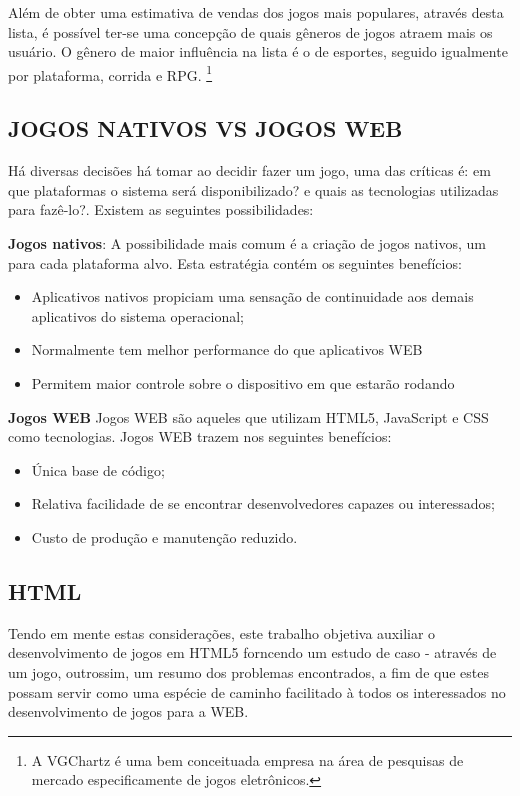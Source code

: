 \documentclass{article}
\begin{document}
Além de obter uma estimativa de vendas dos jogos mais populares, através desta lista, é possível ter-se uma concepção de quais gêneros de jogos atraem mais os usuário. O gênero de maior influência na lista é o de esportes, seguido igualmente por plataforma, corrida e RPG.
\footnote{A VGChartz é uma bem conceituada  empresa na área de pesquisas de mercado especificamente de jogos eletrônicos.}


\subsection{JOGOS NATIVOS VS JOGOS WEB}

Há diversas decisões há tomar ao decidir fazer um jogo, uma das críticas é: em que plataformas o sistema será disponibilizado? e quais as tecnologias utilizadas para fazê-lo?. Existem as seguintes possibilidades: 

\textbf{Jogos nativos}: A possibilidade mais comum é a criação de jogos nativos, um para cada plataforma alvo. Esta estratégia contém os seguintes benefícios: 

\begin{itemize}
    \item  Aplicativos nativos propiciam uma sensação de continuidade aos demais aplicativos do sistema operacional;
    \item  Normalmente tem melhor performance do que aplicativos WEB
    \item  Permitem maior controle sobre o dispositivo em que estarão rodando
\end{itemize}


\textbf{Jogos WEB}
Jogos WEB são aqueles que utilizam HTML5, JavaScript e CSS como tecnologias. Jogos WEB trazem nos seguintes benefícios:

\begin{itemize}
    \item  Única base de código;
    \item  Relativa facilidade de se encontrar desenvolvedores capazes ou interessados;
    \item Custo de produção e manutenção reduzido.
\end{itemize}

\subsection{HTML}

Tendo em mente estas considerações, este trabalho objetiva auxiliar o desenvolvimento de jogos em HTML5 forncendo um estudo de caso - através de um jogo, outrossim, um resumo dos problemas encontrados, a fim de que estes possam servir como uma espécie de caminho facilitado à todos os interessados no desenvolvimento de jogos para a WEB.
\end{document}
